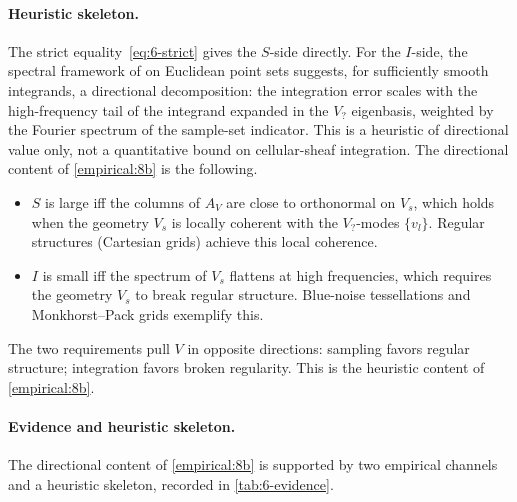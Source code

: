 \paragraph{Heuristic skeleton.}
The strict equality~\cref{eq:6-strict} gives the $S$-side directly.
For the $I$-side, the spectral framework of \cite{Pilleboue2015} on
Euclidean point sets suggests, for sufficiently smooth integrands, a
directional decomposition: the integration error scales with the
high-frequency tail of the integrand expanded in the $V_?$ eigenbasis,
weighted by the Fourier spectrum of the sample-set indicator. This is
a heuristic of directional value only, not a quantitative bound on
cellular-sheaf integration. The directional content of
\cref{empirical:8b} is the following.
\begin{itemize}[leftmargin=*]
\item $S$ is large iff the columns of $A_V$ are close to orthonormal
  on $V_s$, which holds when the geometry $V_s$ is locally coherent
  with the $V_?$-modes $\{v_l\}$. Regular structures (Cartesian grids)
  achieve this local coherence.
\item $I$ is small iff the spectrum of $V_s$ flattens at high
  frequencies, which requires the geometry $V_s$ to break regular
  structure. Blue-noise tessellations \cite{HeitzBelcour2019} and
  Monkhorst--Pack grids \cite{MonkhorstPack1976} exemplify this.
\end{itemize}
The two requirements pull $V$ in opposite directions: sampling favors
regular structure; integration favors broken regularity. This is the
heuristic content of \cref{empirical:8b}.

\paragraph{Evidence and heuristic skeleton.}
The directional content of \cref{empirical:8b} is supported by two
empirical channels and a heuristic skeleton, recorded in
\cref{tab:6-evidence}.

